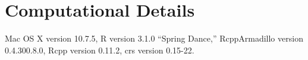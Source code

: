 \section{Computational Details}
\label{append:comp}
Mac OS X version 10.7.5, R version 3.1.0 ``Spring Dance,'' RcppArmadillo version 0.4.300.8.0, Rcpp version 0.11.2, crs version 0.15-22. 

